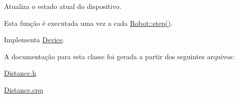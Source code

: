 Atualiza o estado atual do dispositivo. 

Esta função é executada uma vez a cada \hyperlink{classRobot_aa50d73cd1109a70133af442674ed3a1a}{Robot\-::step()}. 

Implementa \hyperlink{classDevice_a7e5226b6341b1cf2ec04a5913b97becc}{Device}.



A documentação para esta classe foi gerada a partir dos seguintes arquivos\-:\begin{DoxyCompactItemize}
\item 
\hyperlink{Distance_8h}{Distance.\-h}\item 
\hyperlink{Distance_8cpp}{Distance.\-cpp}\end{DoxyCompactItemize}
